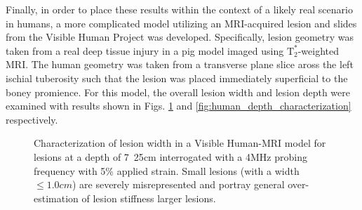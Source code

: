 			Finally, in order to place these results within the context of a likely real scenario in humans, a more complicated model utilizing an MRI-acquired lesion and slides from the Visible Human Project \cite{visiblehuman} was developed. Specifically, lesion geometry was taken from a real deep tissue injury in a pig model imaged using $\mathrm{T}_2^*$-weighted MRI. The human geometry was taken from a transverse plane slice aross the left ischial tuberosity such that the lesion was placed immediately superficial to the boney promience. For this model, the overall lesion width and lesion depth were examined with results shown in Figs. \ref{fig:human_size_characterization} and \ref{fig:human_depth_characterization} respectively.

			\begin{figure}[!t]
				\centering
				\caption{Characterization of lesion width in a Visible Human-MRI model for lesions at a depth of \unit{7.25}{cm} interrogated with a \unit{4}{MHz} probing frequency with \unit{5}{\%} applied strain. Small lesions (with a width $\leq \unit{1.0}{cm}$) are severely misrepresented and portray general over-estimation of lesion stiffness larger lesions.}
				\label{fig:human_size_characterization}
			\end{figure}

